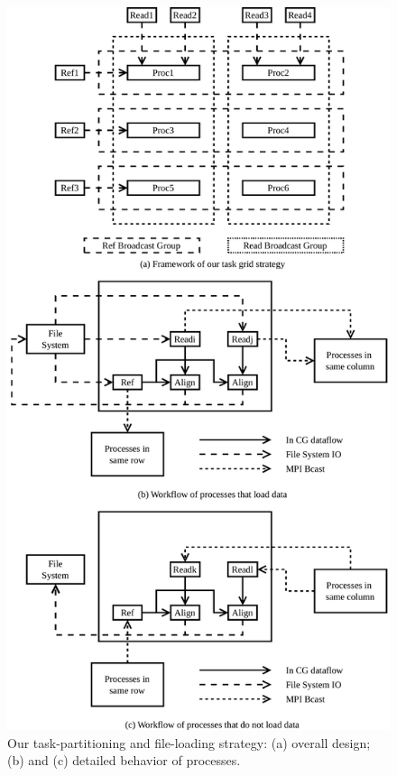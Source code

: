 \documentclass[conference]{IEEEtran}
\begin{document}
\begin{figure}[!htb]
	\includegraphics[width=\linewidth]{figures/GridNew}
	\caption{Our task-partitioning and file-loading strategy: (a) overall design; (b) and (c) detailed behavior of processes.}
	\label{TaskGrid}
\end{figure}
\end{document}
